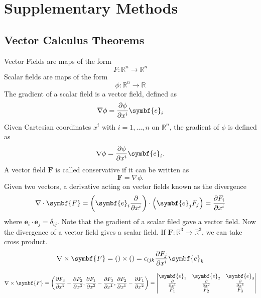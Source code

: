 \chapter{Supplementary Methods}

\section{Vector Calculus Theorems}

Vector Fields are maps of the form
\begin{equation*}
	F\colon\mathbb{R}^{n}\to\mathbb{R}^{n}
\end{equation*}
Scalar fields are maps of the form
\begin{equation*}
	\phi\colon\mathbb{R}^{n}\to\mathbb{R}
\end{equation*}
The gradient of a scalar field is a vector field, defined as
\begin{equation*}
	\nabla\phi=
	\diffp{\phi}{x^{i}}\symbf{e}_{i}
\end{equation*}
Given Cartesian coordinates $x^{i}$ with $i=1,\dotsc,n$ on $\mathbb{R}^{n}$,
the gradient of $\phi$ is defined as
\begin{equation*}
	\nabla\phi=
	\diffp{\phi}{x^{i}}\symbf{e}_{i}.
\end{equation*}
A vector field $\symbf{F}$ is called conservative if it can be written as
\begin{equation*}
	\symbf{F}=\nabla\phi.
\end{equation*}
Given two vectors, a derivative acting on vector fields known as the divergence
\begin{equation*}
	\nabla\cdot\symbf{F}=
	\left(\symbf{e}_{i}\diffp{}{x^{i}}\right)\cdot
	\left(\symbf{e}_{j}F_{j}\right)=
	\diffp{F_{i}}{x^{i}}
\end{equation*}
where $\symbf{e}_{i}\cdot\symbf{e}_{j}=\delta_{ij}$.
Note that the gradient of a scalar filed gave a vector field.
Now the divergence of a vector field gives a scalar field.
If $\symbf{F}\colon\mathbb{R}^{3}\to\mathbb{R}^{3}$, we can take cross product.
\begin{equation*}
	\nabla\times\symbf{F}=
	\left(\right)\times\left(\right)=
	\epsilon_{ijk}\diffp{F_{j}}{x^{i}}\symbf{e}_{k}
\end{equation*}

\begin{equation*}
	\nabla\times\symbf{F}=
	\left(
	\diffp{F_{3}}{x^{2}}-\diffp{F_{2}}{x^{3}},
	\diffp{F_{1}}{x^{3}}-\diffp{F_{3}}{x^{1}},
	\diffp{F_{2}}{x^{1}}-\diffp{F_{1}}{x^{2}}
	\right)=
	\begin{vmatrix}
		\symbf{e}_{1}   & \symbf{e}_{2}   & \symbf{e}_{3}   \\
		\diffp{}{x^{1}} & \diffp{}{x^{2}} & \diffp{}{x^{3}} \\
		F_{1}           & F_{2}           & F_{3}
	\end{vmatrix}
\end{equation*}

